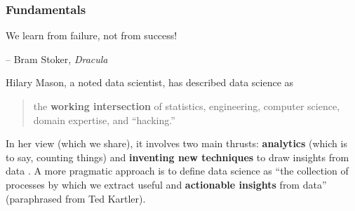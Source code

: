 \subsubsection{Fundamentals}
\begin{tcolorbox}[title=From Data to Wisdom]
We learn from failure, not from success! \\[-0.6cm]
\begin{flushright}
-- Bram Stoker, \textit{Dracula}
\end{flushright}
\end{tcolorbox}
\noindent Hilary Mason, a noted data scientist, has described data science as 
\begin{quote}
    the \textbf{working intersection} of statistics, engineering, computer science, domain expertise, and ``hacking.'' 
\end{quote}
In her view (which we share), it involves two main thrusts: \textbf{analytics} (which is to say, counting things) and \textbf{inventing new techniques} to draw insights from data \cite{DSML_M}.
\newl A more pragmatic approach is to define data science as ``the collection of processes by which we extract useful and \textbf{actionable insights} from data'' (paraphrased from Ted Kartler).
